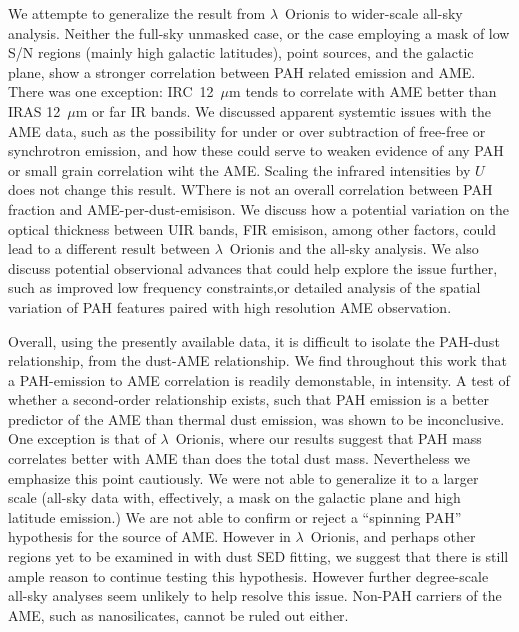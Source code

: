 \documentclass[12pt,a4paper]{article}
\begin{document}
We attempte to generalize the result from $\lambda$~Orionis to wider-scale all-sky analysis. Neither the full-sky unmasked case, or the case employing a mask of low S/N regions (mainly high galactic latitudes), point sources, and the galactic plane, show a stronger correlation between PAH related emission and AME. There was one exception: IRC~12~$\mu$m tends to correlate with AME better than IRAS 12~$\mu$m or far IR bands. We discussed apparent systemtic issues with the AME data, such as the possibility for under or over subtraction of free-free or synchrotron emission, and how these could serve to weaken evidence of any PAH or small grain correlation wiht the AME. Scaling the infrared intensities by $U$ does not change this result. WThere is not an overall correlation between PAH fraction and AME-per-dust-emisison. We discuss how a potential variation on the optical thickness between UIR bands, FIR emisison, among other factors, could lead to a different result between $\lambda$~Orionis and the all-sky analysis. We also discuss potential observional advances that could help explore the issue further, such as improved low frequency constraints,or detailed analysis of the spatial variation of PAH features paired with high resolution AME observation.

Overall, using the presently available data, it is difficult to isolate the PAH-dust relationship, from the dust-AME relationship. We find throughout this work that a PAH-emission to AME correlation is readily demonstable, in intensity. A test of whether a second-order relationship exists, such that PAH emission is a better predictor of the AME than thermal dust emission, was shown to be inconclusive. One exception is that of $\lambda$~Orionis, where our results suggest that PAH mass correlates better with AME than does the total dust mass. Nevertheless we emphasize this point cautiously. We were not able to generalize it to a larger scale (all-sky data with, effectively, a mask on the galactic plane and high latitude emission.)  We are not able to confirm or reject a ``spinning PAH'' hypothesis for the source of AME. However in $\lambda$~Orionis, and perhaps other regions yet to be examined in with dust SED fitting, we suggest that there is still ample reason to continue testing this hypothesis. However further degree-scale all-sky analyses seem unlikely to help resolve this issue. Non-PAH carriers of the AME, such as nanosilicates, cannot be ruled out either.


\small


\end{document}
